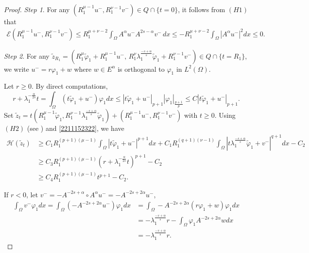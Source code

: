 \documentclass[10pt]{article}
\numberwithin{equation}{section}
\numberwithin{equation}{section}
\begin{document}
\begin{proof}
\smallskip
{\it Step 1}. For any $(R_1^{\mu-1}u^-, R_1^{\nu-1}v^-)\in Q\cap \{t=0\}$, it follows from $(H1)$ that
\[
\begin{aligned}
\mathcal{E}(R_1^{\mu-1}u^-, R_1^{\nu-1}v^-)\le R_1^{\mu+\nu-2}\int_{\Omega}A^{\alpha}u^- A^{2s-\alpha}v^-\, dx \le -R_1^{\mu+\nu-2}\int_{\Omega}|A^{\alpha}u^-|^2 dx \le 0.
\end{aligned}
\]

{\it Step 2}. For any $\widetilde{z}_{R_1}=(R_1^{\mu}\widetilde{\varphi}_1 +R_1^{\mu-1}u^-,\, R_1^{\nu}\lambda_1^{\frac{-s+\alpha}{s}}\widetilde{\varphi}_1 +R_1^{\nu-1}v^-)\in Q\cap \{t=R_1\}$, we write $u^-=r\varphi_1+w$ where $w\in E^{\alpha}$ is orthogonal to $\varphi_1$ in $L^2(\Omega)$.
\smallskip

Let $r\ge 0$. By direct computations,
\begin{equation}\label{2211152322}
r+\lambda_1^{-\frac{\alpha}{2s}}t=\int_{\Omega}(t\widetilde{\varphi}_1+ u^-){\varphi}_1 dx\le |t\widetilde{\varphi}_1+ u^-|_{p+1}|\varphi_1|_\frac{p+1}{p}\le C|t\widetilde{\varphi}_1+ u^-|_{p+1}.
\end{equation}
Set $\widetilde{z}_t=t(R_1^{\mu-1}\widetilde{\varphi}_1, R_1^{\nu-1}\lambda_1^{\frac{-s+\alpha}{s}}\widetilde{\varphi}_1)+(R_1^{\mu-1}u^-, R_1^{\nu-1}v^-)$ with $t\ge 0$.
Using $(H2)$ (see \cite[Lemma 1.1]{Felmer1993}) and \eqref{2211152322}, we have
\begin{equation}\label{2210112040}
\begin{aligned}
\mathcal{H}(\widetilde{z}_t)& \ge C_1R_1^{(p+1)(\mu-1)}\int_{\Omega}|t\widetilde{\varphi}_1+u^-|^{p+1} dx  + C_1R_1^{(q+1)(\nu-1)}\int_{\Omega}|t\lambda_1^{\frac{-s+\alpha}{s}}\widetilde{\varphi}_1 +v^-|^{q+1} dx-C_2\\
& \ge C_3 R_1^{(p+1)(\mu-1)}(r+\lambda_1^{-\frac{\alpha}{2s}}t)^{p+1}-C_2\\
 & \ge C_4 R_1^{(p+1)(\mu-1)}t^{p+1}-C_2.
\end{aligned}
\end{equation}
\par
If $r<0$, let $v^-=-A^{-2s+\alpha}\circ A^{\alpha}u^- = -A^{-2s+2\alpha} u^-$,
\[
\begin{aligned}
\int_{\Omega} v^- \varphi_1dx = \int_{\Omega}(-A^{-2s+2\alpha}u^-) \varphi_1 dx
& = \int_{\Omega}-A^{-2s+2\alpha} (r\varphi_1+w) \varphi_1 dx\\
&= -\lambda_1^{\frac{-s+\alpha}{s}}r-\int_{\Omega}\varphi_1A^{-2s+2\alpha} w dx\\
&= -\lambda_1^{\frac{-s+\alpha}{s}}r.
\end{aligned}
\]
\end{proof}
\end{document}

